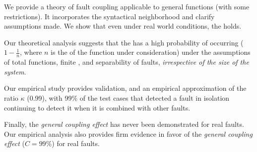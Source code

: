 \documentclass[preprint,nonatbib]{sigplanconf}\usepackage[]{graphicx}\usepackage[]{color}
\begin{document}
We provide a theory of fault coupling applicable to general
functions (with some restrictions). It incorporates the syntactical neighborhood
and clarify assumptions made. We show that even under real world conditions,
the \efaultT holds.

Our theoretical analysis suggests that the \faultT has
a high probability of occurring ($1 - \frac{1}{n}$, where $n$ is the \foutput
of the function under consideration) under the assumptions of total functions,
finite \finput, and separability of faults, \emph{irrespective of the size of
the system}.

Our empirical study provides validation, and an empirical approximation of
the \couplingC ratio
$\kappa$ (0.99), with 99\% of the test cases that detected a fault in
isolation continuing to detect it when it is combined with other faults.

Finally, the \emph{general coupling effect} has never been demonstrated for
real faults. Our empirical analysis also provides firm evidence in favor of the
\emph{general coupling effect} ($C = 99\%$) for real faults.







% 






\end{document}
